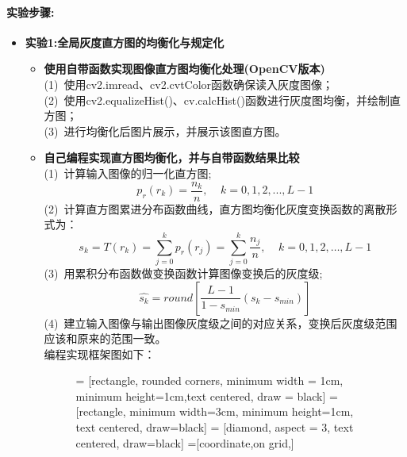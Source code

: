 \documentclass{ctexart}
\begin{document}
\paragraph{实验步骤:} 
\begin{itemize}
\item \textbf{实验1:全局灰度直方图的均衡化与规定化}
\begin{itemize}
\item \textbf{使用自带函数实现图像直方图均衡化处理(OpenCV版本)}\\
(1)~使用cv2.imread、cv2.cvtColor函数确保读入灰度图像；\\
(2)~使用cv2.equalizeHist()、cv.calcHist()函数进行灰度图均衡，并绘制直方图；\\
(3)~进行均衡化后图片展示，并展示该图直方图。
\item \textbf{自己编程实现直方图均衡化，并与自带函数结果比较}\\
(1)~计算输入图像的归一化直方图;
\[
    p_r(r_k) = \frac{n_k}{n}, ~~~~~ k = 0,1,2,...,L-1
\]
(2)~计算直方图累进分布函数曲线，直方图均衡化灰度变换函数的离散形式为：
\[
    s_k = T(r_k) = \sum_{j=0}^k p_r(r_j) = \sum_{j=0}^k \frac{n_j}{n},
    ~~~~~ k=0,1,2,…,L-1
\]
(3)~用累积分布函数做变换函数计算图像变换后的灰度级;
\[
    \widehat{s_k} = round[\frac{L-1}{1-s_{min}} (s_k-s_{min})]
\]
(4)~建立输入图像与输出图像灰度级之间的对应关系，变换后灰度级范围应该和原来的范围一致。\\
编程实现框架图如下：\\
\begin{figure}
\scriptsize
\centering
{} = [rectangle, rounded corners, minimum width = 1cm, minimum height=1cm,text centered, draw = black]
 = [rectangle, minimum width=3cm, minimum height=1cm, text centered, draw=black]
 = [diamond, aspect = 3, text centered, draw=black]
=[coordinate,on grid,]
\end{figure}


\end{itemize}
\end{itemize}
\end{document}
